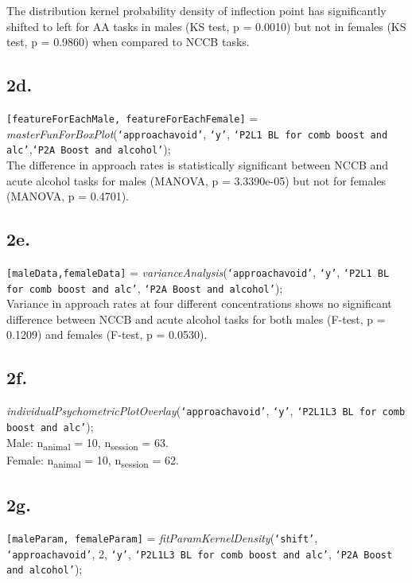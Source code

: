 \documentclass{article}
\begin{document}
The distribution kernel probability density of inflection point has significantly shifted to left for AA tasks in males (KS test, p = 0.0010) but not in females (KS test, p = 0.9860) when compared to NCCB tasks.

\subsection{2d.}
\texttt{[featureForEachMale, featureForEachFemale]} = \emph{masterFunForBoxPlot}(\texttt{`approachavoid'}, \texttt{`y'}, \texttt{`P2L1 BL for comb boost and alc'},\texttt{`P2A Boost and alcohol'});\\

The difference in approach rates is statistically significant between NCCB and acute alcohol tasks for males (MANOVA, p = 3.3390e-05) but not for females (MANOVA, p = 0.4701).\\

\subsection{2e.}
\texttt{[maleData,femaleData]} = \emph{varianceAnalysis}(\texttt{`approachavoid'}, \texttt{`y'}, \texttt{`P2L1 BL for comb boost and alc'}, \texttt{`P2A Boost and alcohol'});\\

Variance in approach rates at four different concentrations shows no significant difference between NCCB and acute alcohol tasks for both males (F-test, p = 0.1209) and females (F-test, p = 0.0530).

\subsection{2f.}
\emph{individualPsychometricPlotOverlay}(\texttt{`approachavoid'}, \texttt{`y'}, \texttt{`P2L1L3 BL for comb boost and alc'});\\
Male: n\textsubscript{animal} = 10, n\textsubscript{session} = 63.\\
Female: n\textsubscript{animal} = 10, n\textsubscript{session} = 62.\\

\subsection{2g.}
\texttt{[maleParam, femaleParam]} = \emph{fitParamKernelDensity}(\texttt{`shift'}, \texttt{`approachavoid'}, 2, \texttt{`y'}, \texttt{`P2L1L3 BL for comb boost and alc'}, \texttt{`P2A Boost and alcohol'});\\
\end{document}
